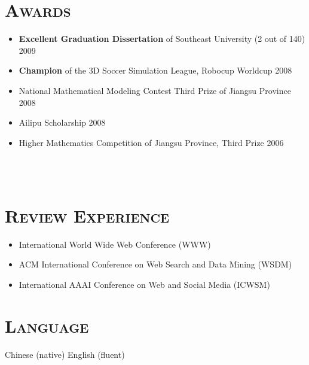 \begin{resume}
\section{\textsc{Awards}}
\begin{itemize}
\item {\bf Excellent Graduation Dissertation} of Southeast University (2 out of 140) \hfill  2009
\item {\bf Champion} of the 3D Soccer Simulation League, Robocup Worldcup \hfill 2008
\item National Mathematical Modeling Contest Third Prize of Jiangsu Province \hfill  2008
\item Ailipu Scholarship \hfill  2008
\item Higher Mathematics Competition of Jiangsu Province, Third Prize \hfill 2006
\end{itemize}

\begin{formatb}
  \\
  \body\\
\end{formatb}

\section{\textsc{Review Experience}}
\begin{itemize}
  \item International World Wide Web Conference (WWW)
  \item ACM International Conference on Web Search and Data Mining (WSDM)
  \item International AAAI Conference on Web and Social Media (ICWSM)
\end{itemize}


\section{\textsc{Language}}
Chinese (native) \hspace{3cm} English (fluent)





\end{resume}
